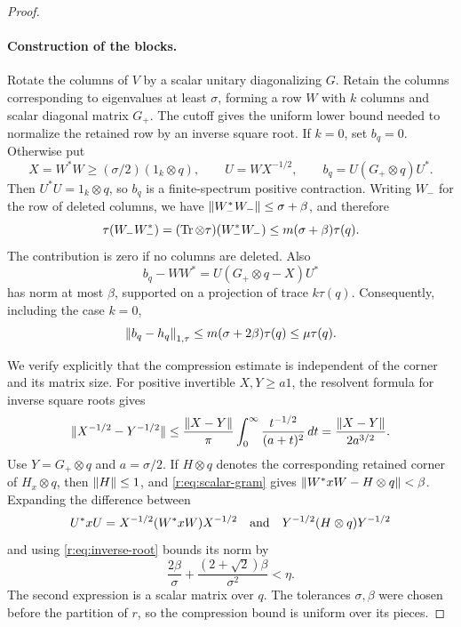\begin{proof}
\paragraph{Construction of the blocks.}
Rotate the columns of \(V\) by a scalar unitary diagonalizing \(G\).
Retain the columns corresponding to eigenvalues at least \(\sigma\),
forming a row \(W\) with \(k\) columns and scalar diagonal matrix \(G_+\).
The cutoff gives the uniform lower bound needed to normalize the retained
row by an inverse square root.
If \(k=0\), set \(b_q=0\). Otherwise put
\begin{equation}\label{r:eq:polar-block}
 X=W^*W\geq(\sigma/2)(1_k\otimes q),\qquad
 U=WX^{-1/2},\qquad b_q=U(G_+\otimes q)U^*.
\end{equation}
Then \(U^*U=1_k\otimes q\), so \(b_q\) is a finite-spectrum positive
contraction.
Writing \(W_-\) for the row of deleted columns, we have
\(\lVert W_-^*W_-\rVert\leq\sigma+\beta\), and therefore
\[
 \tau(W_-W_-^*)=(\operatorname{Tr}\otimes\tau)(W_-^*W_-)
 \leq m(\sigma+\beta)\tau(q).
\]
The contribution is zero if no columns are deleted. Also
\[
 b_q-WW^*=U(G_+\otimes q-X)U^*
\]
has norm at most \(\beta\), supported on a projection of trace
\(k\tau(q)\). Consequently, including the case \(k=0\),
\begin{equation}\label{r:eq:finite-spectrum-close}
 \left\|b_q-h_q\right\|_{1,\tau}
 \leq m(\sigma+2\beta)\tau(q)\leq\mu\tau(q).
\end{equation}

We verify explicitly that the compression estimate is independent of
the corner and its matrix size. For positive invertible \(X,Y\geq a1\),
the resolvent formula for inverse square roots gives
\begin{equation}\label{r:eq:inverse-root}
 \lVert X^{-1/2}-Y^{-1/2}\rVert
 \leq\frac{\lVert X-Y\rVert}{\pi}
       \int_0^\infty\frac{t^{-1/2}}{(a+t)^2}\,dt
 =\frac{\lVert X-Y\rVert}{2a^{3/2}}.
\end{equation}
Use \(Y=G_+\otimes q\) and \(a=\sigma/2\).
If \(H\otimes q\) denotes the corresponding retained corner of
\(H_x\otimes q\), then \(\lVert H\rVert\leq1\), and
\eqref{r:eq:scalar-gram} gives
\(\lVert W^*xW-H\otimes q\rVert<\beta\).
Expanding the difference between
\[
 U^*xU=X^{-1/2}(W^*xW)X^{-1/2}
 \quad\hbox{and}\quad Y^{-1/2}(H\otimes q)Y^{-1/2}
\]
and using \eqref{r:eq:inverse-root} bounds its norm by
\[
 \frac{2\beta}{\sigma}
 +\frac{(2+\sqrt2)\beta}{\sigma^2}<\eta.
\]
The second expression is a scalar matrix over \(q\). The tolerances
\(\sigma,\beta\) were chosen before the partition of \(r\), so the
compression bound is uniform over its pieces.


\end{proof}

